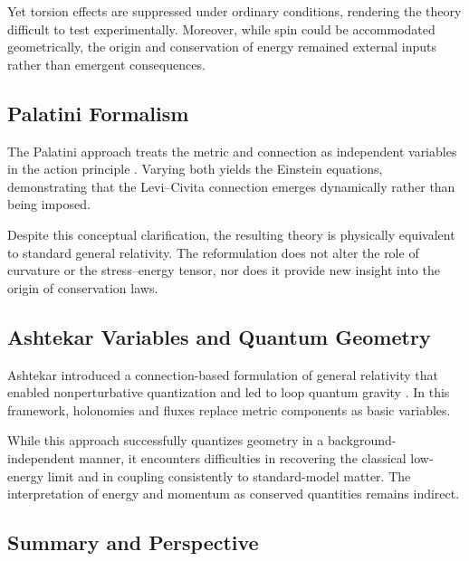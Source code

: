 \documentclass[%
 reprint,
 amsmath,amssymb,
 aps,
 prb,
]{revtex4-2}
\numberwithin{equation}{section}
\begin{document}
Yet torsion effects are suppressed under ordinary conditions, rendering the theory difficult to test experimentally. Moreover, while spin could be accommodated geometrically, the origin and conservation of energy remained external inputs rather than emergent consequences.

\subsection{Palatini Formalism}
\label{sec:palatini}

The Palatini approach treats the metric and connection as independent variables in the action principle \cite{Palatini1919}. Varying both yields the Einstein equations, demonstrating that the Levi--Civita connection emerges dynamically rather than being imposed.

Despite this conceptual clarification, the resulting theory is physically equivalent to standard general relativity. The reformulation does not alter the role of curvature or the stress--energy tensor, nor does it provide new insight into the origin of conservation laws.

\subsection{Ashtekar Variables and Quantum Geometry}
\label{sec:ashtekar}

Ashtekar introduced a connection-based formulation of general relativity that enabled nonperturbative quantization and led to loop quantum gravity \cite{Ashtekar1986}. In this framework, holonomies and fluxes replace metric components as basic variables.

While this approach successfully quantizes geometry in a background-independent manner, it encounters difficulties in recovering the classical low-energy limit and in coupling consistently to standard-model matter. The interpretation of energy and momentum as conserved quantities remains indirect.

\subsection{Summary and Perspective}
\label{sec:historical_summary}
\end{document}
